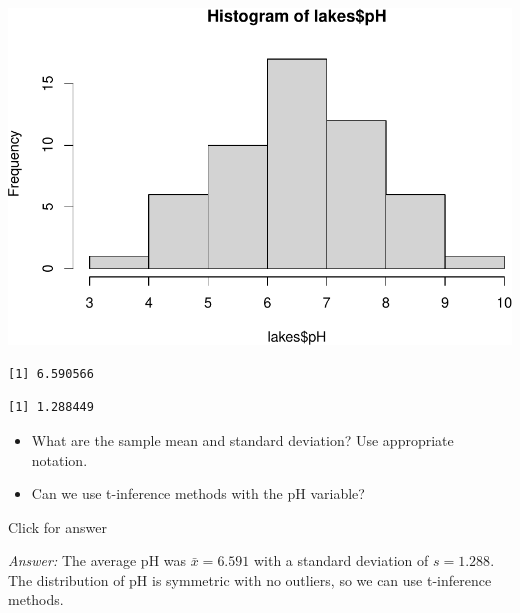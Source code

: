 \documentclass[
]{book}
\newenvironment{Shaded}{\begin{snugshade}}{\end{snugshade}}
\newcommand{\FunctionTok}[1]{\textcolor[rgb]{0.00,0.00,0.00}{#1}}
\newcommand{\NormalTok}[1]{#1}
\newcommand{\SpecialCharTok}[1]{\textcolor[rgb]{0.00,0.00,0.00}{#1}}
\providecommand{\tightlist}{%
  \setlength{\itemsep}{0pt}\setlength{\parskip}{0pt}}
\begin{document}
\includegraphics[width=1\linewidth]{Class_Activity_18_files/figure-latex/unnamed-chunk-2-1}

\begin{Shaded}
\end{Shaded}

\begin{verbatim}
[1] 6.590566
\end{verbatim}

\begin{Shaded}
\end{Shaded}

\begin{verbatim}
[1] 1.288449
\end{verbatim}

\begin{itemize}
\tightlist
\item
  What are the sample mean and standard deviation? Use appropriate notation.
\item
  Can we use t-inference methods with the pH variable?
\end{itemize}

Click for answer

\emph{Answer:} The average pH was \(\bar{x} = 6.591\) with a standard deviation of \(s=1.288\). The distribution of pH is symmetric with no outliers, so we can use t-inference methods.
\end{document}
